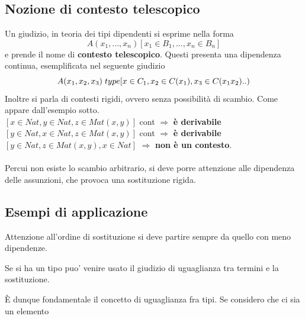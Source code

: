 \documentclass[10pt,a4paper, italian]{book}
\begin{document}
{{\subsection{Nozione di contesto telescopico}
\label{subsec:contesto-telescopico}
Un giudizio, in teoria dei tipi dipendenti si esprime nella forma
\[A(x_1,...,x_n)[x_1 \in B_1,...,x_n \in B_n]\]
e prende il nome di \textbf{contesto telescopico}.
Questi presenta una dipendenza continua, esemplificata nel seguente giudizio
\[A(x_1,x_2,x_3)\hspace{0.1cm}type[x \in C_1, x_2 \in C(x_1), x_3 \in C(x_1 x_2)..)\]
Inoltre si parla di contesti rigidi, ovvero senza possibilit\`a di scambio. Come appare dall'esempio sotto. \\
$[x \in Nat, y \in Nat, z \in Mat(x,y)]$ cont  $\Rightarrow$ \textbf{\`e derivabile}\\
$[y \in Nat, x \in Nat, z \in Mat(x,y)]$ cont $\Rightarrow$ \textbf{\`e derivabile}\\
$[y \in Nat, z \in Mat(x,y), x \in Nat]$ $\Rightarrow$ \textbf{non \`e un contesto}. \\\\ Percui non esiste lo scambio arbitrario, si deve porre attenzione alle dipendenza delle assunzioni, che provoca una sostituzione rigida.
\subsection{Esempi di applicazione}
\label{subsec:esempi-di-applicazione}
Attenzione all'ordine di sostituzione si deve partire sempre da quello con meno dipendenze.
\begin{prooftree}
\end{prooftree}

\begin{prooftree}
\end{prooftree}
Se si ha un tipo puo' venire usato il giudizio di uguaglianza tra termini e la sostituzione.
\begin{prooftree}
\end{prooftree}
\noindent
\`E dunque fondamentale il concetto di uguaglianza fra tipi. Se considero che ci sia un elemento

}}
\end{document}
